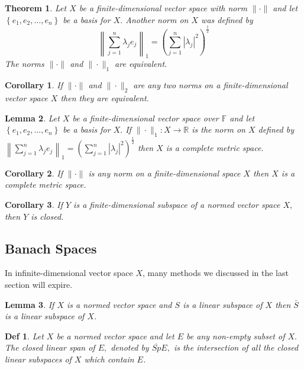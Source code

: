 \documentclass[10pt]{paper}
\newtheorem{theorem}{Theorem}[section]
\newtheorem{definition}{Def}[section]
\newtheorem{corollary}{Corollary}[section]
\newtheorem{lemma}[theorem]{Lemma}
\begin{document}
\begin{theorem}
    Let $X$ be a finite-dimensional vector space with norm $\|\cdot\|$ and let $\left\{e_{1}, e_{2}, \ldots, e_{n}\right\}$ be a basis for $X .$ Another norm on $X$ was defined by
    $$
        \left\|\sum_{j=1}^{n} \lambda_{j} e_{j}\right\|_{1}=\left(\sum_{j=1}^{n}\left|\lambda_{j}\right|^{2}\right)^{\frac{1}{2}}
    $$
    The norms $\|\cdot\|$ and $\|\cdot\|_{1}$ are equivalent.
\end{theorem}

\begin{corollary}
    If $\|\cdot\|$ and $\|\cdot\|_{2}$ are any two norms on a finite-dimensional vector space $X$ then they are equivalent.
\end{corollary}

\begin{lemma}
    Let $X$ be a finite-dimensional vector space over $\mathbb{F}$ and let $\left\{e_{1}, e_{2}, \ldots, e_{n}\right\}$ be a basis for $X .$ If $\|\cdot\|_{1}: X \rightarrow \mathbb{R}$ is the norm on $X$ defined by $\left\|\sum_{j=1}^{n} \lambda_{j} e_{j}\right\|_{1}=\left(\sum_{j=1}^{n}\left|\lambda_{j}\right|^{2}\right)^{\frac{1}{2}}$ then $X$ is a complete metric space.
\end{lemma}

\begin{corollary}
    If $\|\cdot\|$ is any norm on a finite-dimensional space $X$ then $X$ is a complete metric
    space.
\end{corollary}

\begin{corollary}
    If $Y$ is a finite-dimensional subspace of a normed vector space $X,$ then $Y$ is closed.
\end{corollary}

\subsection{Banach Spaces}

\par In infinite-dimensional vector space $X$, many methods we discussed in the last section will expire.

\begin{lemma}
    If $X$ is a normed vector space and $S$ is a linear subspace of $X$ then $\bar{S}$ is a linear subspace of $X$.
\end{lemma}


\begin{definition}
    Let $X$ be a normed vector space and let $E$ be any non-empty subset of $X .$ The closed linear span of $E,$ denoted by $\overline{Sp} E,$ is the intersection of all the closed linear subspaces of $X$ which contain $E$.
\end{definition}
\end{document}
